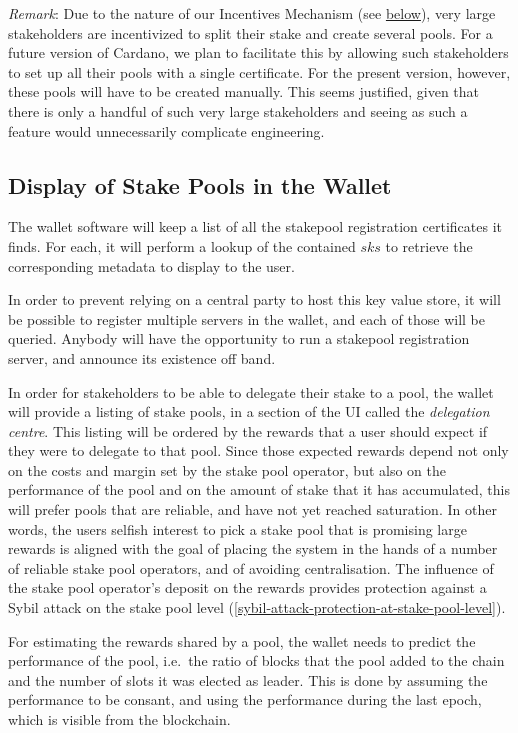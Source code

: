 \documentclass[11pt,a4paper]{article}
\begin{document}
\emph{Remark}: Due to the nature of our Incentives Mechanism (see
\hyperref[design-of-incentives]{below}), very large stakeholders are
incentivized to split their stake and create several pools. For a future
version of Cardano, we plan to facilitate this by allowing such
stakeholders to set up all their pools with a single certificate. For
the present version, however, these pools will have to be created
manually. This seems justified, given that there is only a handful of
such very large stakeholders and seeing as such a feature would
unnecessarily complicate engineering.

\subsection{Display of Stake Pools in the Wallet}
\label{display-of-stake-pools-in-the-wallet}

The wallet software will keep a list of all the stakepool registration
certificates it finds. For each, it will perform a lookup of the
contained \(sks\) to retrieve the corresponding metadata to display to
the user.

In order to prevent relying on a central party to host this key value
store, it will be possible to register multiple servers in the wallet,
and each of those will be queried. Anybody will have the opportunity to
run a stakepool registration server, and announce its existence off
band.

In order for stakeholders to be able to delegate their stake to a pool,
the wallet will provide a listing of stake pools, in a section of the UI
called the \emph{delegation centre}. This listing will be ordered by the
rewards that a user should expect if they were to delegate to that pool.
Since those expected rewards depend not only on the costs and margin set
by the stake pool operator, but also on the performance of the pool and
on the amount of stake that it has accumulated, this will prefer pools
that are reliable, and have not yet reached saturation. In other words,
the users selfish interest to pick a stake pool that is promising large
rewards is aligned with the goal of placing the system in the hands of a
number of reliable stake pool operators, and of avoiding centralisation.
The influence of the stake pool operator's deposit on the rewards
provides protection against a Sybil attack on the stake pool level
(\cref{sybil-attack-protection-at-stake-pool-level}).

For estimating the rewards shared by a pool, the wallet needs to predict
the performance of the pool, i.e.~the ratio of blocks that the pool
added to the chain and the number of slots it was elected as leader.
This is done by assuming the performance to be consant, and using the
performance during the last epoch, which is visible from the blockchain.
\end{document}
